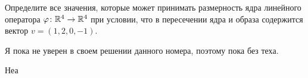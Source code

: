 \begin{condition}
    Определите все значения, которые может принимать размерность ядра линейного оператора $\varphi \colon \mathbb{R}^4 \to \mathbb{R}^4$ при условии, что в пересечении ядра и образа содержится вектор $v = (1, 2, 0, -1)$.
\end{condition}
Я пока не уверен в своем решении данного номера, поэтому пока без теха.

Неа
